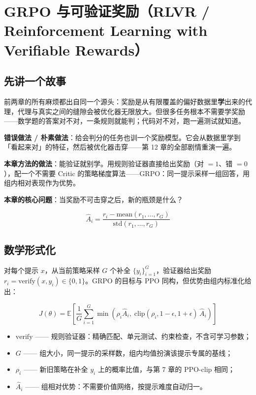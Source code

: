 \documentclass{article}
\begin{document}
\section*{GRPO 与可验证奖励（RLVR / Reinforcement Learning with Verifiable Rewards）}

\subsection*{先讲一个故事}

前两章的所有麻烦都出自同一个源头：奖励是从有限覆盖的偏好数据里\textbf{学}出来的代理，代理与真实之间的缝隙会被优化器无限放大。但很多任务根本不需要学奖励——数学题的答案对不对，一条规则就能判；代码对不对，跑一遍测试就知道。

\textbf{错误做法 / 朴素做法}：给会判分的任务也训一个奖励模型。它会从数据里学到「看起来对」的特征，然后被优化器击穿——第 12 章的全部剧情重演一遍。

\textbf{本章方法的做法}：能验证就别学。用规则验证器直接给出奖励（对 $=1$、错 $=0$），配一个不需要 Critic 的策略梯度算法——GRPO：同一提示采样一组回答，用组内相对表现作为优势。

\textbf{本章的核心问题}：当奖励不可击穿之后，新的瓶颈是什么？

\[
\boxed{\hat{A}_{i} = \frac{r_{i} - \mathrm{mean}(r_{1},\dots,r_{G})}{\mathrm{std}(r_{1},\dots,r_{G})}}
\]

\subsection*{数学形式化}

对每个提示 $x$，从当前策略采样 $G$ 个补全 $\{y_{i}\}_{i=1}^{G}$，验证器给出奖励 $r_{i}=\mathrm{verify}(x, y_{i})\in\{0,1\}$。GRPO 的目标与 PPO 同构，但优势由组内标准化给出：

\[
\boxed{J(\theta) = \mathbb{E}\left[\frac{1}{G}\sum_{i=1}^{G} \min\!\left(\rho_{i}\hat{A}_{i},\; \mathrm{clip}(\rho_{i}, 1\!-\!\epsilon, 1\!+\!\epsilon)\,\hat{A}_{i}\right)\right]}
\]

\begin{itemize}
  \item $\mathrm{verify}$ —— 规则验证器：精确匹配、单元测试、约束检查，不含可学习参数；
  \item $G$ —— 组大小，同一提示的采样数，组内均值扮演该提示专属的基线；
  \item $\rho_{i}$ —— 新旧策略在补全 $y_{i}$ 上的概率比值，与第 7 章的 PPO-clip 相同；
  \item $\hat{A}_{i}$ —— 组相对优势：不需要价值网络，按提示难度自动归一。
\end{itemize}
\end{document}
